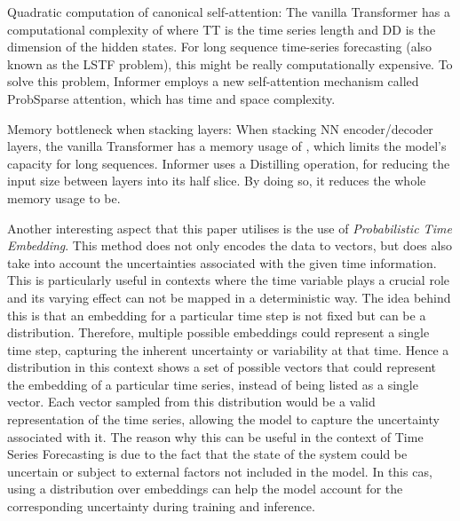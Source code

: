 \documentclass{article}
\begin{document}
    Quadratic computation of canonical self-attention:
    The vanilla Transformer has a computational complexity of  where TT is the time series length and DD is the dimension of the hidden states. For long sequence time-series forecasting (also known as the LSTF problem), this might be really computationally expensive. To solve this problem, Informer employs a new self-attention mechanism called ProbSparse attention, which has time and space complexity.
    
    Memory bottleneck when stacking layers:
    When stacking NN encoder/decoder layers, the vanilla Transformer has a memory usage of , which limits the model's capacity for long sequences. Informer uses a Distilling operation, for reducing the input size between layers into its half slice. By doing so, it reduces the whole memory usage to be.

Another interesting aspect that this paper utilises is the use of \textit{Probabilistic Time Embedding}. This method does not only encodes the data to vectors, but does also take into account the uncertainties associated with the given time information. This is particularly useful in contexts where the time variable plays a crucial role and its varying effect can not be mapped in a deterministic way. The idea behind this is that an embedding for a particular time step is not fixed but can be a distribution. Therefore, multiple possible embeddings could represent a single time step, capturing the inherent uncertainty or variability at that time. Hence a distribution in this context shows a set of possible vectors that could represent the embedding of a particular time series, instead of being listed as a single vector. Each vector sampled from this distribution would be a valid representation of the time series, allowing the model to capture the uncertainty associated with it. The reason why this can be useful in the context of Time Series Forecasting is due to the fact that the state of the system could be uncertain or subject to external factors not included in the model. In this cas, using a distribution over embeddings can help the model account for the corresponding uncertainty during training and inference.






\newpage

\printbibliography
\end{document}
